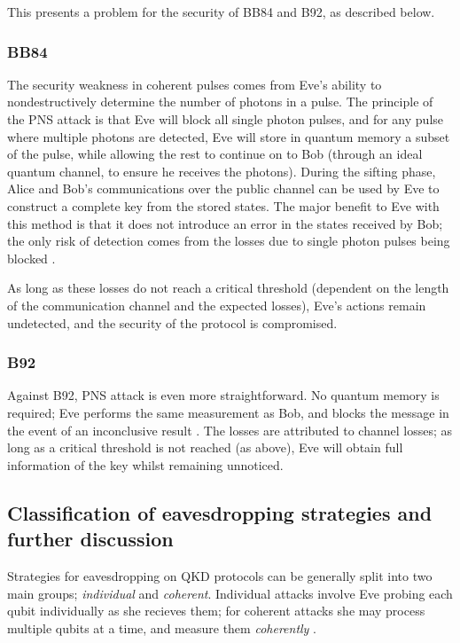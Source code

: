 \documentclass[paper=a4, fontsize=11pt]{scrartcl} %
\numberwithin{equation}{section} %
\numberwithin{figure}{section} %
\numberwithin{table}{section} %
\begin{document}
This presents a problem for the security of BB84 and B92, as described below.

\subsubsection*{BB84}
The security weakness in coherent pulses comes from Eve's ability to nondestructively determine the number of photons
in a pulse. The principle of the PNS attack is that Eve will block all single photon pulses, and for any pulse where
multiple photons are detected, Eve will store in quantum memory a subset of the pulse, while allowing the rest to continue
on to Bob (through an ideal quantum channel, to ensure he receives the photons). During the sifting
phase, Alice and Bob's communications over the public channel can be used by Eve to construct
a complete key from the stored states. The major benefit to Eve with this method is that it does not introduce an error in the
states received by Bob; the only risk of detection comes from the losses due to single photon pulses being blocked \citep{kronberg2009}.

As long as these losses do not reach a critical threshold (dependent on the length of the communication channel and the expected losses),
Eve's actions remain undetected, and the security of the protocol is compromised.


\subsubsection*{B92}
Against B92, PNS attack is even more straightforward. No quantum memory is required; Eve performs
the same measurement as Bob, and blocks the message in the event of an inconclusive result \citep{kronberg2009}. The losses are attributed
to channel losses; as long as a critical threshold is not reached (as above), Eve will obtain full information of the key whilst remaining unnoticed.

\subsection{Classification of eavesdropping strategies and further discussion}
Strategies for eavesdropping on QKD protocols can be generally split into two main groups;
\textit{individual} and \textit{coherent}. Individual attacks involve
Eve probing each qubit individually as she recieves them; for coherent attacks
she may process multiple qubits at a time, and measure them \textit{coherently} \citep{gisin2002}.
\end{document}
